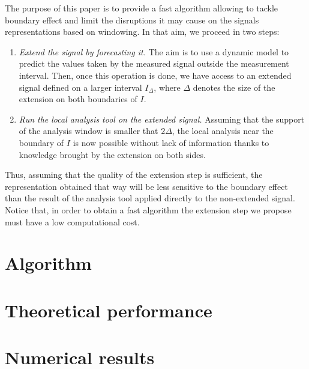 \documentclass[twoside,letterpaper]{article}
\begin{document}
The purpose of this paper is to provide a fast algorithm allowing to tackle boundary effect and limit the disruptions it may cause on the signals representations based on windowing. In that aim, we proceed in two steps:
\begin{enumerate}
\item \emph{Extend the signal by forecasting it.} The aim is to use a dynamic model to predict the values taken by the measured signal outside the measurement interval. Then, once this operation is done, we have access to an extended signal defined on a larger interval $I_\Delta$, where $\Delta$ denotes the size of the extension on both boundaries of $I$. 
\item \emph{Run the local analysis tool on the extended signal.} Assuming that the support of the analysis window is smaller that $2\Delta$, the local analysis near the boundary of $I$ is now possible without lack of information thanks to knowledge brought by the extension on both sides. 
\end{enumerate}
Thus, assuming that the quality of the extension step is sufficient, the representation obtained that way will be less sensitive to the boundary effect than the result of the analysis tool applied directly to the non-extended signal. Notice that, in order to obtain a fast algorithm the extension step we propose must have a low computational cost.

\section{Algorithm}
\label{se:algo}



\section{Theoretical performance}
\label{se:theoretical}


\section{Numerical results}




\end{document}

